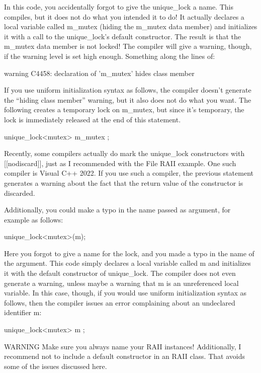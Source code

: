 In this code, you accidentally forgot to give the unique\_lock a name. This compiles, but it does not do what you intended it to do! It actually declares a local variable called m\_mutex (hiding the m\_mutex data member) and initializes it with a call to the unique\_lock’s default constructor. The result is that the m\_mutex data member is not locked! The compiler will give a warning, though, if the warning level is set high enough. Something along the lines of:

\begin{shell}
warning C4458: declaration of 'm_mutex' hides class member
\end{shell}

If you use uniform initialization syntax as follows, the compiler doesn’t generate the “hiding class member” warning, but it also does not do what you want. The following creates a temporary lock on m\_mutex, but since it’s temporary, the lock is immediately released at the end of this statement.

\begin{cpp}
unique_lock<mutex> { m_mutex };
\end{cpp}

Recently, some compilers actually do mark the unique\_lock constructors with [[nodiscard]], just as I recommended with the File RAII example. One such compiler is Visual C++ 2022. If you use such a compiler, the previous statement generates a warning about the fact that the return value of the constructor is discarded.

Additionally, you could make a typo in the name passed as argument, for example as follows:

\begin{cpp}
unique_lock<mutex>(m);
\end{cpp}

Here you forgot to give a name for the lock, and you made a typo in the name of the argument. This code simply declares a local variable called m and initializes it with the default constructor of unique\_lock. The compiler does not even generate a warning, unless maybe a warning that m is an unreferenced local variable. In this case, though, if you would use uniform initialization syntax as follows, then the compiler issues an error complaining about an undeclared identifier m:

\begin{cpp}
unique_lock<mutex> { m };
\end{cpp}

\begin{myWarning}{WARNING}
Make sure you always name your RAII instances! Additionally, I recommend not to include a default constructor in an RAII class. That avoids some of the issues discussed here.
\end{myWarning}

